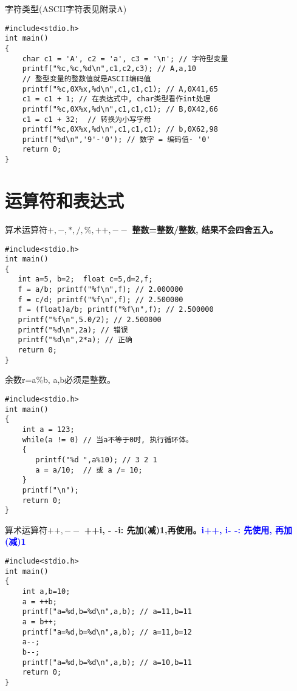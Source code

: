 \begin{frame}[fragile]{字符类型(ASCII字符表见附录A)}
\begin{lstlisting}
#include<stdio.h>           
int main()                   
{                            
    char c1 = 'A', c2 = 'a', c3 = '\n'; // 字符型变量
    printf("%c,%c,%d\n",c1,c2,c3); // A,a,10
    // 整型变量的整数值就是ASCII编码值
    printf("%c,0X%x,%d\n",c1,c1,c1); // A,0X41,65
    c1 = c1 + 1; // 在表达式中, char类型看作int处理
    printf("%c,0X%x,%d\n",c1,c1,c1); // B,0X42,66
    c1 = c1 + 32;  // 转换为小写字母
    printf("%c,0X%x,%d\n",c1,c1,c1); // b,0X62,98
    printf("%d\n",'9'-'0'); // 数字 = 编码值- '0'
    return 0;           
}                            
\end{lstlisting}
\end{frame}

\section{运算符和表达式}

\begin{frame}[fragile]{算术运算符$+, -, *, /, \%, ++, --$}
\textbf{整数=整数/整数, 结果不会四舍五入。}
\begin{lstlisting}
#include<stdio.h>           
int main()                   
{                            
   int a=5, b=2;  float c=5,d=2,f;
   f = a/b; printf("%f\n",f); // 2.000000
   f = c/d; printf("%f\n",f); // 2.500000
   f = (float)a/b; printf("%f\n",f); // 2.500000
   printf("%f\n",5.0/2); // 2.500000
   printf("%d\n",2a); // 错误
   printf("%d\n",2*a); // 正确
   return 0;           
}                            
\end{lstlisting}
\end{frame}

\begin{frame}[fragile]{余数r=a\%b, a,b必须是整数。}
\begin{lstlisting}
#include<stdio.h>           
int main()                   
{                            
    int a = 123;
    while(a != 0) // 当a不等于0时, 执行循环体。
    {
       printf("%d ",a%10); // 3 2 1
       a = a/10;  // 或 a /= 10;
    }
    printf("\n");
    return 0;           
}                            
\end{lstlisting}
\end{frame}

\begin{frame}[fragile]{算术运算符$++,--$}
\textbf{++i, - -i: 先加(减)1,再使用。}\textcolor{blue}{\textbf{i++, i- -: 先使用, 再加(减)1}}
\begin{lstlisting}
#include<stdio.h>           
int main()                   
{                            
    int a,b=10;
    a = ++b;
    printf("a=%d,b=%d\n",a,b); // a=11,b=11  
    a = b++;
    printf("a=%d,b=%d\n",a,b); // a=11,b=12
    a--;
    b--;
    printf("a=%d,b=%d\n",a,b); // a=10,b=11
    return 0;           
}                            
\end{lstlisting}
\end{frame}

